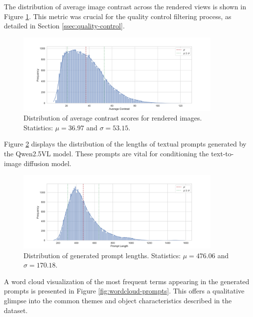 The distribution of average image contrast across the rendered views is shown in Figure \ref{fig:dist-avg-contrast}. This metric was crucial for the quality control filtering process, as detailed in Section \ref{ssec:quality-control}.

\begin{figure}[h]
  \centering
  \includegraphics[width=0.9\textwidth]{images/data/objaverse_visualizations/distribution_average_contrast.jpeg}
  \caption{Distribution of average contrast scores for rendered images. Statistics: $\mu = 36.97$ and $\sigma = 53.15$.}
  \label{fig:dist-avg-contrast}
\end{figure}

Figure \ref{fig:dist-prompt-length} displays the distribution of the lengths of textual prompts generated by the Qwen2.5VL model. These prompts are vital for conditioning the text-to-image diffusion model.

\begin{figure}[h]
  \centering
  \includegraphics[width=0.9\textwidth]{images/data/objaverse_visualizations/distribution_prompt_length.jpeg}
  \caption{Distribution of generated prompt lengths. Statistics: $\mu = 476.06$ and $\sigma = 170.18$.}
  \label{fig:dist-prompt-length}
\end{figure}

A word cloud visualization of the most frequent terms appearing in the generated prompts is presented in Figure \ref{fig:wordcloud-prompts}. This offers a qualitative glimpse into the common themes and object characteristics described in the dataset.

